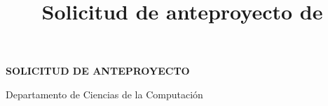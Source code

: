 
\graphicspath{{../../logos/}{../../figures/}{../../diagrams/}} %
 

\title{Solicitud de anteproyecto de \mybookworktypefull} %
\date{\myanteproyectodate}                               %
\author{\mybookauthor}


\pagestyle{empty}

% 


% 

\begin{spacing}{1.0}
\begin{center}

  \Large\textbf{SOLICITUD DE ANTEPROYECTO \MakeUppercase{\mybookworktypefull}}

  Departamento de Ciencias de la Computación

\end{center}
\end{spacing}
\vspace{0.5cm}

